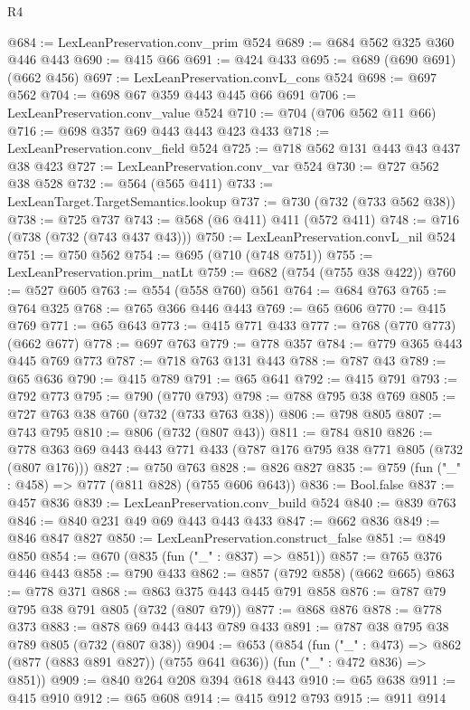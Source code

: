 \begin{lexlean}{R4}
\begin{coremodule}
@684 := LexLeanPreservation.conv_prim @524
@689 := @684 @562 @325 @360 @446 @443
@690 := @415 @66
@691 := @424 @433
@695 := @689 (@690 @691) (@662 @456)
@697 := LexLeanPreservation.convL_cons @524
@698 := @697 @562
@704 := @698 @67 @359 @443 @445 @66 @691
@706 := LexLeanPreservation.conv_value @524
@710 := @704 (@706 @562 @11 @66)
@716 := @698 @357 @69 @443 @443 @423 @433
@718 := LexLeanPreservation.conv_field @524
@725 := @718 @562 @131 @443 @43 @437 @38 @423
@727 := LexLeanPreservation.conv_var @524
@730 := @727 @562 @38 @528
@732 := @564 (@565 @411)
@733 := LexLeanTarget.TargetSemantics.lookup
@737 := @730 (@732 (@733 @562 @38))
@738 := @725 @737
@743 := @568 (@6 @411) @411 (@572 @411)
@748 := @716 (@738 (@732 (@743 @437 @43)))
@750 := LexLeanPreservation.convL_nil @524
@751 := @750 @562
@754 := @695 (@710 (@748 @751))
@755 := LexLeanPreservation.prim_natLt
@759 := @682 (@754 (@755 @38 @422))
@760 := @527 @605
@763 := @554 (@558 @760) @561
@764 := @684 @763
@765 := @764 @325
@768 := @765 @366 @446 @443
@769 := @65 @606
@770 := @415 @769
@771 := @65 @643
@773 := @415 @771 @433
@777 := @768 (@770 @773) (@662 @677)
@778 := @697 @763
@779 := @778 @357
@784 := @779 @365 @443 @445 @769 @773
@787 := @718 @763 @131 @443
@788 := @787 @43
@789 := @65 @636
@790 := @415 @789
@791 := @65 @641
@792 := @415 @791
@793 := @792 @773
@795 := @790 (@770 @793)
@798 := @788 @795 @38 @769
@805 := @727 @763 @38 @760 (@732 (@733 @763 @38))
@806 := @798 @805
@807 := @743 @795
@810 := @806 (@732 (@807 @43))
@811 := @784 @810
@826 := @778 @363 @69 @443 @443 @771 @433 (@787 @176 @795 @38 @771 @805 (@732 (@807 @176)))
@827 := @750 @763
@828 := @826 @827
@835 := @759 (fun ("_" : @458) => @777 (@811 @828) (@755 @606 @643))
@836 := Bool.false
@837 := @457 @836
@839 := LexLeanPreservation.conv_build @524
@840 := @839 @763
@846 := @840 @231 @49 @69 @443 @443 @433
@847 := @662 @836
@849 := @846 @847 @827
@850 := LexLeanPreservation.construct_false
@851 := @849 @850
@854 := @670 (@835 (fun ("_" : @837) => @851))
@857 := @765 @376 @446 @443
@858 := @790 @433
@862 := @857 (@792 @858) (@662 @665)
@863 := @778 @371
@868 := @863 @375 @443 @445 @791 @858
@876 := @787 @79 @795 @38 @791 @805 (@732 (@807 @79))
@877 := @868 @876
@878 := @778 @373
@883 := @878 @69 @443 @443 @789 @433
@891 := @787 @38 @795 @38 @789 @805 (@732 (@807 @38))
@904 := @653
    (@854
      (fun ("_" : @473) => @862 (@877 (@883 @891 @827)) (@755 @641 @636))
      (fun ("_" : @472 @836) => @851))
@909 := @840 @264 @208 @394 @618 @443
@910 := @65 @638
@911 := @415 @910
@912 := @65 @608
@914 := @415 @912 @793
@915 := @911 @914

\end{coremodule}
\end{lexlean}
